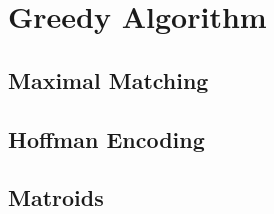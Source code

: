 \chapter{Greedy Algorithm}

\section{Maximal Matching}

\section{Hoffman Encoding}

\section{Matroids}